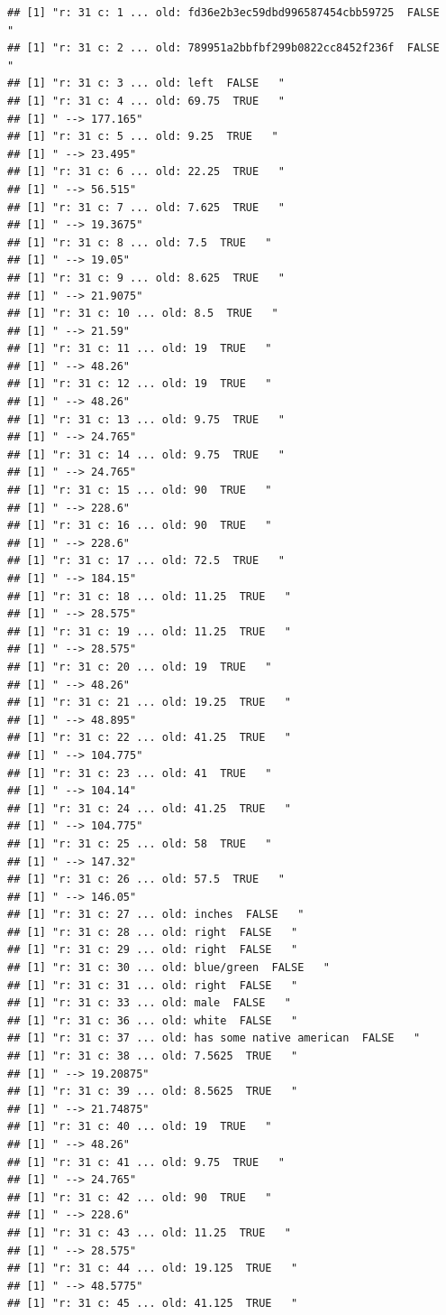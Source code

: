 \documentclass[]{article}
\begin{document}
\begin{verbatim}
## [1] "r: 31 c: 1 ... old: fd36e2b3ec59dbd996587454cbb59725  FALSE   "
## [1] "r: 31 c: 2 ... old: 789951a2bbfbf299b0822cc8452f236f  FALSE   "
## [1] "r: 31 c: 3 ... old: left  FALSE   "
## [1] "r: 31 c: 4 ... old: 69.75  TRUE   "
## [1] " --> 177.165"
## [1] "r: 31 c: 5 ... old: 9.25  TRUE   "
## [1] " --> 23.495"
## [1] "r: 31 c: 6 ... old: 22.25  TRUE   "
## [1] " --> 56.515"
## [1] "r: 31 c: 7 ... old: 7.625  TRUE   "
## [1] " --> 19.3675"
## [1] "r: 31 c: 8 ... old: 7.5  TRUE   "
## [1] " --> 19.05"
## [1] "r: 31 c: 9 ... old: 8.625  TRUE   "
## [1] " --> 21.9075"
## [1] "r: 31 c: 10 ... old: 8.5  TRUE   "
## [1] " --> 21.59"
## [1] "r: 31 c: 11 ... old: 19  TRUE   "
## [1] " --> 48.26"
## [1] "r: 31 c: 12 ... old: 19  TRUE   "
## [1] " --> 48.26"
## [1] "r: 31 c: 13 ... old: 9.75  TRUE   "
## [1] " --> 24.765"
## [1] "r: 31 c: 14 ... old: 9.75  TRUE   "
## [1] " --> 24.765"
## [1] "r: 31 c: 15 ... old: 90  TRUE   "
## [1] " --> 228.6"
## [1] "r: 31 c: 16 ... old: 90  TRUE   "
## [1] " --> 228.6"
## [1] "r: 31 c: 17 ... old: 72.5  TRUE   "
## [1] " --> 184.15"
## [1] "r: 31 c: 18 ... old: 11.25  TRUE   "
## [1] " --> 28.575"
## [1] "r: 31 c: 19 ... old: 11.25  TRUE   "
## [1] " --> 28.575"
## [1] "r: 31 c: 20 ... old: 19  TRUE   "
## [1] " --> 48.26"
## [1] "r: 31 c: 21 ... old: 19.25  TRUE   "
## [1] " --> 48.895"
## [1] "r: 31 c: 22 ... old: 41.25  TRUE   "
## [1] " --> 104.775"
## [1] "r: 31 c: 23 ... old: 41  TRUE   "
## [1] " --> 104.14"
## [1] "r: 31 c: 24 ... old: 41.25  TRUE   "
## [1] " --> 104.775"
## [1] "r: 31 c: 25 ... old: 58  TRUE   "
## [1] " --> 147.32"
## [1] "r: 31 c: 26 ... old: 57.5  TRUE   "
## [1] " --> 146.05"
## [1] "r: 31 c: 27 ... old: inches  FALSE   "
## [1] "r: 31 c: 28 ... old: right  FALSE   "
## [1] "r: 31 c: 29 ... old: right  FALSE   "
## [1] "r: 31 c: 30 ... old: blue/green  FALSE   "
## [1] "r: 31 c: 31 ... old: right  FALSE   "
## [1] "r: 31 c: 33 ... old: male  FALSE   "
## [1] "r: 31 c: 36 ... old: white  FALSE   "
## [1] "r: 31 c: 37 ... old: has some native american  FALSE   "
## [1] "r: 31 c: 38 ... old: 7.5625  TRUE   "
## [1] " --> 19.20875"
## [1] "r: 31 c: 39 ... old: 8.5625  TRUE   "
## [1] " --> 21.74875"
## [1] "r: 31 c: 40 ... old: 19  TRUE   "
## [1] " --> 48.26"
## [1] "r: 31 c: 41 ... old: 9.75  TRUE   "
## [1] " --> 24.765"
## [1] "r: 31 c: 42 ... old: 90  TRUE   "
## [1] " --> 228.6"
## [1] "r: 31 c: 43 ... old: 11.25  TRUE   "
## [1] " --> 28.575"
## [1] "r: 31 c: 44 ... old: 19.125  TRUE   "
## [1] " --> 48.5775"
## [1] "r: 31 c: 45 ... old: 41.125  TRUE   "

\end{verbatim}
\end{document}
